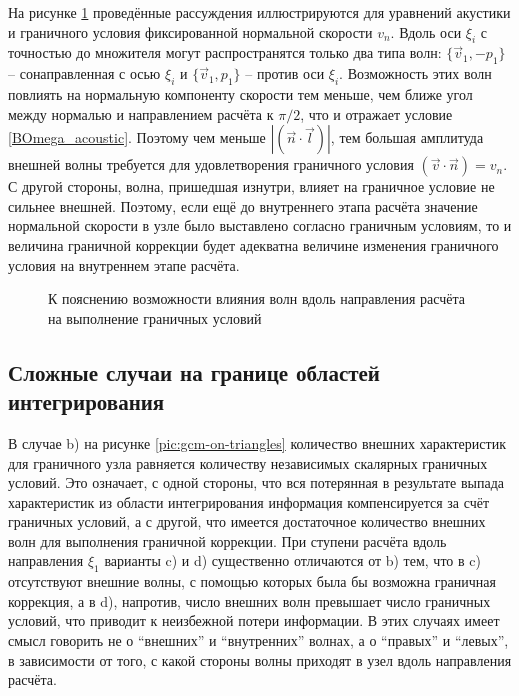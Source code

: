 \documentclass[a4paper]{article}
\numberwithin{equation}{section}
\begin{document}
На рисунке \ref{pic:fixed-normal-velocity} проведённые рассуждения иллюстрируются для 
уравнений акустики и граничного условия фиксированной нормальной скорости $v_n$. 
Вдоль оси $\xi_i$ с точностью до множителя могут распространятся только два типа волн:
$\{ \vec{v}_1, - p_1 \}$ -- сонаправленная с осью $\xi_i$ и 
$\{ \vec{v}_1, p_1 \}$ -- против оси $\xi_i$. 
Возможность этих волн повлиять на нормальную компоненту скорости тем меньше, чем 
ближе угол между нормалью и направлением расчёта к $\pi/2$, что и отражает условие 
\ref{BOmega_acoustic}. Поэтому чем меньше $|(\vec{n} \cdot \vec{l})|$, тем большая амплитуда 
внешней волны требуется для удовлетворения граничного условия $(\vec{v} \cdot \vec{n}) = v_n$. 
С другой стороны, волна, пришедшая изнутри, влияет на граничное условие не сильнее внешней. 
Поэтому, если ещё до внутреннего этапа расчёта значение нормальной скорости в узле 
было выставлено согласно граничным условиям, то и величина граничной коррекции будет 
адекватна величине изменения граничного условия на внутреннем этапе расчёта.

\begin{figure}[H]
	\caption{К пояснению возможности влияния волн вдоль направления расчёта на выполнение граничных условий}
	\label{pic:fixed-normal-velocity}
\end{figure}


\subsection{Сложные случаи на границе областей интегрирования}
\label{bad_border_cases}
В случае b) на рисунке \ref{pic:gcm-on-triangles} 
количество внешних характеристик для граничного узла равняется количеству независимых 
скалярных граничных условий. Это означает, с одной стороны, 
что вся потерянная в результате выпада характеристик из области интегрирования информация 
компенсируется за счёт граничных условий, а с другой, 
что имеется достаточное количество внешних волн для выполнения граничной коррекции. 
При ступени расчёта вдоль направления $\xi_1$ варианты c) и d) 
существенно отличаются от b) тем, что  
в c) отсутствуют внешние волны, с помощью которых была бы возможна граничная коррекция, 
а в d), напротив, число внешних волн превышает число граничных условий, что 
приводит к неизбежной потери информации. В этих случаях имеет смысл говорить не о 
``внешних'' и ``внутренних'' волнах, а о ``правых'' и ``левых'', в зависимости от 
того, с какой стороны волны приходят в узел вдоль направления расчёта.
\end{document}
